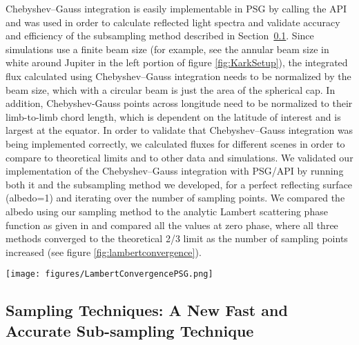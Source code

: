 \documentclass[12pt, letterpaper]{aastex631}
\begin{document}
Chebyshev--Gauss integration is easily implementable in PSG by calling the API and was used in order to calculate reflected light spectra and validate accuracy and efficiency of the subsampling method described in Section~\ref{subsec:subsample}.  Since simulations use a finite beam size (for example, see the annular beam size in white around Jupiter in the left portion of figure \ref{fig:KarkSetup}), the integrated flux calculated using Chebyshev--Gauss integration needs to be normalized by the beam size, which with a circular beam is just the area of the spherical cap.  In addition, Chebyshev-Gauss points across longitude need to be normalized to their limb-to-limb chord length, which is dependent on the latitude of interest and is largest at the equator.  In order to validate that Chebyshev--Gauss integration was being implemented correctly, we calculated fluxes for different scenes in order to compare to theoretical limits and to other data and simulations. We validated our implementation of the Chebyshev--Gauss integration with PSG/API by running both it and the subsampling method we developed, for a perfect reflecting surface (albedo=1) and iterating over the number of sampling points. We compared the albedo using our sampling method to the analytic Lambert scattering phase function as given in \textcite{2012ApJ...747...25M} and compared all the values at zero phase, where all three methods converged to the theoretical 2/3 limit as the number of sampling points increased (see figure \ref{fig:lambertconvergence}). 

\begin{figure*}
  \centering
  \texttt{[image: figures/LambertConvergencePSG.png]}
  \caption{A plot of the PSG sub-sample method compared to the analytic Lambert scattering phase function \citep{2012ApJ...747...25M}.  There is strong agreement between the two ($<$1\% difference with sufficient samples - the 10 sample case is shown here), and both the sub-sample and Chebyshev-Gauss method as implemented in PSG converge to the Lambertian limit of 2/3 at full phase.}
  \label{fig:lambertconvergence}
\end{figure*}

\subsection{Sampling Techniques: A New Fast and Accurate Sub-sampling Technique} \label{subsec:subsample}
\end{document}
